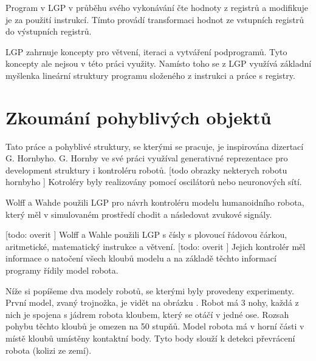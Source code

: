 Program v LGP v průběhu svého vykonávání čte hodnoty z registrů a modifikuje je za použití instrukcí.
Tímto provádí transformaci hodnot ze vstupních registrů do výstupních registrů.

LGP zahrnuje koncepty pro větvení, iteraci a vytváření podprogramů.
Tyto koncepty ale nejsou v této práci využity.
Namísto toho se z LGP využívá základní myšlenka lineární struktury programu složeného z instrukci a práce s registry.



\chapter{Zkoumání pohyblivých objektů}



Tato práce a pohyblivé struktury, se kterými se pracuje, je inspirována dizertací G. Hornbyho.
G. Hornby ve své práci využíval generativné reprezentace pro development struktury i kontroléru robotů.
[todo obrazky nekterych robotu hornbyho ]
Kotroléry byly realizovány pomocí oscilátorů nebo neuronových sítí.

Wolff a Wahde použili LGP pro návrh kontroléru modelu humanoidního robota, který měl v simulovaném prostředí chodit a následovat zvukové signály.

[todo: overit ] Wolff a Wahle použili LGP s čísly s plovoucí řádovou čárkou, aritmetické, matematický instrukce a větvení.
[todo: overit ] Jejich kontrolér měl informace o natočení všech kloubů modelu a na základě těchto informací programy řídily model robota.




Níže si popíšeme dva modely robotů, se kterými byly provedeny experimenty.
První model, zvaný trojnožka, je vidět na obrázku .
Robot má 3 nohy, každá z nich je spojena s jádrem robota kloubem, který se otáčí v jedné ose.
Rozsah pohybu těchto kloubů je omezen na 50 stupňů.
Model robota má v horní části v místě kloubů umístěny kontaktní body.
Tyto body slouží k detekci převrácení robota (kolizi ze zemí).

